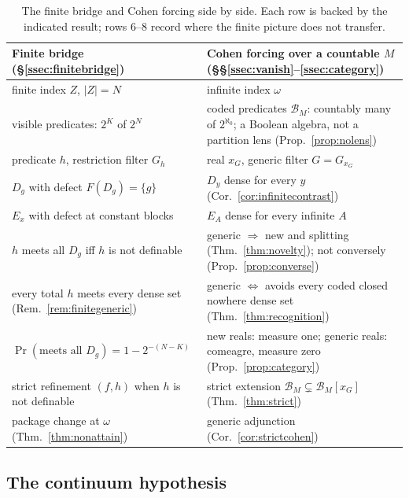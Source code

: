 \documentclass[11pt]{article}
\theoremstyle{definition}
\begin{document}
\begin{table}[tbp]\centering
\small
\begin{tabular}{@{}p{}p{}@{}}
\toprule
Finite bridge (\S\ref{ssec:finitebridge}) & Cohen forcing over a countable $M$ (\S\S\ref{ssec:vanish}--\ref{ssec:category}) \\
\midrule
finite index $Z$, $|Z|=N$ & infinite index $\omega$ \\
visible predicates: $2^K$ of $2^N$ & coded predicates $\mathcal B_M$: countably many of $2^{\aleph_0}$; a Boolean algebra, not a partition lens (Prop.~\ref{prop:nolens}) \\
predicate $h$, restriction filter $G_h$ & real $x_G$, generic filter $G=G_{x_G}$ \\
$D_g$ with defect $F(D_g)=\{g\}$ & $D_y$ dense for every $y$ (Cor.~\ref{cor:infinitecontrast}) \\
$E_x$ with defect at constant blocks & $E_A$ dense for every infinite $A$ \\
$h$ meets all $D_g$ iff $h$ is not definable & generic $\Rightarrow$ new and splitting (Thm.~\ref{thm:novelty}); not conversely (Prop.~\ref{prop:converse}) \\
every total $h$ meets every dense set (Rem.~\ref{rem:finitegeneric}) & generic $\Leftrightarrow$ avoids every coded closed nowhere dense set (Thm.~\ref{thm:recognition}) \\
$\Pr(\text{meets all }D_g)=1-2^{-(N-K)}$ & new reals: measure one; generic reals: comeagre, measure zero (Prop.~\ref{prop:category}) \\
strict refinement $(f,h)$ when $h$ is not definable & strict extension $\mathcal B_M\subsetneq\mathcal B_M[x_G]$ (Thm.~\ref{thm:strict}) \\
package change at $\omega$ (Thm.~\ref{thm:nonattain}) & generic adjunction (Cor.~\ref{cor:strictcohen}) \\
\bottomrule
\end{tabular}
\caption{The finite bridge and Cohen forcing side by side. Each row is backed by the indicated
result; rows 6--8 record where the finite picture does not transfer.}\label{tab:correspondence}
\end{table}

\subsection{The continuum hypothesis}\label{sec:ch}
\end{document}
